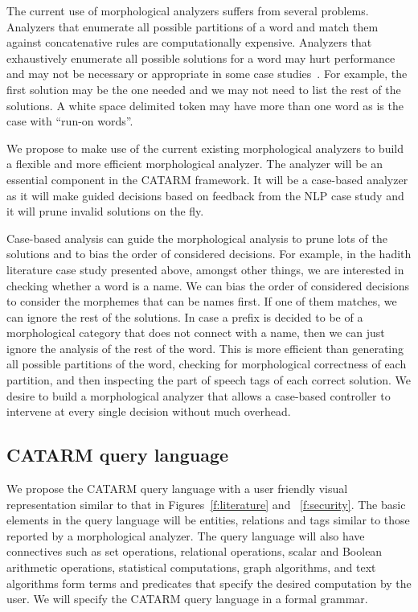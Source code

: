 \documentclass[12pt]{article}
\begin{document}
The current use of morphological analyzers suffers from 
several problems. 
Analyzers that enumerate all possible partitions of a word
and match them against concatenative rules are computationally 
expensive. 
Analyzers that exhaustively enumerate all possible solutions 
for a word may hurt performance and may
not be necessary or appropriate in some case studies~\cite{Maamouri:10}. 
For example, the first solution may be the one needed and 
we may not need to list the rest of the solutions. 
A white space delimited token may have more than one word
as is the case with ``run-on words''.

We propose to make use of the current existing morphological
analyzers to build a flexible and more efficient
morphological analyzer. 
The analyzer will be an essential
component in the CATARM framework. 
It will be a case-based analyzer as it will make guided decisions
based on feedback from the NLP case study and it will prune
invalid solutions on the fly. 

Case-based analysis can guide the morphological analysis
to prune lots of the solutions and to bias the order of considered
decisions. 
For example, in the hadith literature case study presented above, 
amongst other things, we are interested in checking whether a 
word is a name.  
We can bias the order of considered decisions to consider the 
morphemes that can be names first. 
If one of them matches, we can ignore the rest of the solutions. 
In case a prefix is decided to be of a morphological category
that does not connect with a name, then we can just ignore
the analysis of the rest of the word. 
This is more efficient than generating all possible partitions
of the word, checking for morphological correctness of each 
partition, and then inspecting the part of speech tags of each
correct solution. 
We desire to build a morphological analyzer that allows a 
case-based controller to intervene at every single decision
without much overhead. 

\subsection{CATARM query language}
\label{s:design:query}

We propose the CATARM query language with a user friendly
visual representation similar to that in Figures~\ref{f:literature} and
~\ref{f:security}. 
The basic elements in the query language will be entities, relations
and tags similar to those reported by a morphological analyzer. 
The query language will also have connectives such as set operations, 
relational operations, 
scalar and Boolean arithmetic operations, 
statistical computations, graph algorithms, and text algorithms
form terms and predicates that specify the desired computation
by the user. 
We will specify the CATARM query language in a formal grammar.
\end{document}
